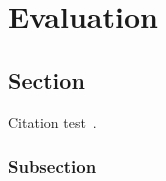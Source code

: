 
\chapter{Evaluation}\label{chapter:Evaluation}

\section{Section}
Citation test~\parencite{latex}. \parencite{meinkampf} 

\subsection{Subsection}
